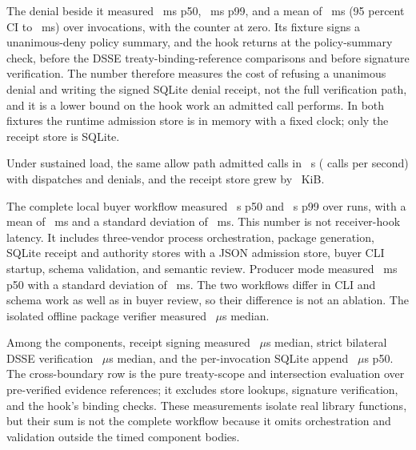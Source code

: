 The denial beside it measured \PSPredispatchDenyPFiftyMs~ms p50,
\PSPredispatchDenyPNinetyNineMs~ms p99, and a mean of
\PSPredispatchDenyMeanMs~ms (95 percent CI \PSPredispatchDenyCiLowMs{} to
\PSPredispatchDenyCiHighMs~ms) over \PSPredispatchDenySampleCount{}
invocations, with the counter at zero. Its fixture signs a unanimous-deny
policy summary, and the hook returns  at
the policy-summary check, before the DSSE treaty-binding-reference
comparisons and before signature verification. The number therefore measures
the cost of refusing a unanimous denial and writing the signed SQLite denial
receipt, not the full verification path, and it is a lower bound on the hook
work an admitted call performs. In both fixtures the runtime admission store
is in memory with a fixed clock; only the receipt store is SQLite.

Under sustained load, the same allow path admitted \PSSustainedCalls{} calls
in \PSSustainedSeconds~s (\PSSustainedCallsPerSecond{} calls per second) with
\PSSustainedDispatchCount{} dispatches and \PSSustainedDenials{} denials, and
the receipt store grew by \PSSustainedReceiptStoreGrowthKiB~KiB.

The complete local buyer workflow measured \PSBuyerWorkflowPFiftySec~s p50 and
\PSBuyerWorkflowPNinetyNineSec~s p99 over \PSPathSampleCount{} runs, with a
mean of \PSBuyerWorkflowMeanMs~ms and a standard deviation of
\PSBuyerWorkflowStdMs~ms. This number is not receiver-hook latency. It includes
three-vendor process orchestration, package generation, SQLite receipt and
authority stores with a JSON admission store, buyer CLI startup, schema
validation, and semantic review. Producer mode measured
\PSProducerPFiftyMs~ms p50 with a standard deviation of \PSProducerStdMs~ms.
The two workflows differ in CLI and schema work as well as in buyer review,
so their difference is not an ablation. The isolated offline package verifier
measured \PSBuyerVerifyPFiftyUs~\(\mu\)s median.

Among the components, receipt signing measured
\PSReceiptSignPFiftyUs~\(\mu\)s median, strict bilateral DSSE verification
\PSBilateralVerifyPFiftyUs~\(\mu\)s median, and the per-invocation SQLite
append \PSReceiptAppendPFiftyUs~\(\mu\)s p50. The cross-boundary row is the
pure treaty-scope and intersection evaluation over pre-verified evidence
references; it excludes store lookups, signature verification, and the hook's
binding checks. These measurements isolate real library functions, but their
sum is not the complete workflow because it omits orchestration and
validation outside the timed component bodies.

